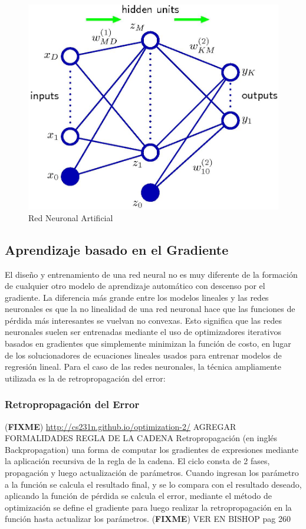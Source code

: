 \documentclass[a4paper,11pt,spanish]{book}
\newcommand*{\FIXME}[1]{{(\textbf{FIXME}) {#1}}}
\begin{document}
	\begin{figure}[H]
	  \begin{center}
	    \includegraphics[scale=0.5]{./img/bishop_neural_network.jpg}
	  \end{center}
	  \caption{Red Neuronal Artificial}
	  \label{fig:neural_network}
	\end{figure}

      \subsection{Aprendizaje basado en el Gradiente}
	El diseño y entrenamiento de una red neural no es muy diferente de la formación de cualquier otro modelo de aprendizaje automático con descenso por el gradiente.
	La diferencia más grande entre los modelos lineales y las redes neuronales es que la no linealidad de una red neuronal hace que las funciones de pérdida
	más interesantes se vuelvan no convexas. Esto significa que las redes neuronales suelen ser entrenadas mediante el uso de optimizadores iterativos basados ​​en gradientes
	que simplemente minimizan la función de costo, en lugar de los solucionadores de ecuaciones lineales usados ​​para entrenar modelos de regresión lineal. Para el caso de las
	redes neuronales, la técnica ampliamente utilizada es la de retropropagación del error:

	\subsubsection{Retropropagación del Error}
	  \FIXME{\url{http://cs231n.github.io/optimization-2/} AGREGAR FORMALIDADES REGLA DE LA CADENA}
	  Retropropagación (en inglés Backpropagation) una forma  de computar los gradientes de expresiones mediante la aplicación recursiva de la regla de la cadena.
	  El ciclo consta de 2 fases, propagación y luego actualización de parámetros. Cuando ingresan los parámetro a la función se calcula el resultado final, y se lo compara con el resultado
	  deseado, aplicando la función de pérdida se calcula el error, mediante el método de optimización se define el gradiente para luego realizar la retropropagación en la función hasta
	  actualizar los parámetros.
	  \FIXME{VER EN BISHOP pag 260}
\end{document}
